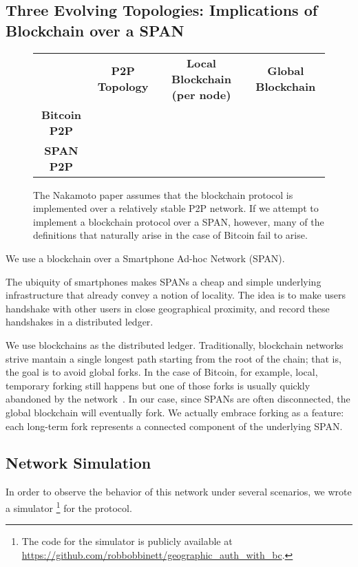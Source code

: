\subsection{Three Evolving Topologies: Implications of Blockchain over a SPAN}

\begin{figure*}
	\centering
	\begin{tabular}{|c||c|c|c|}
		\hline
		\ & \textbf{P2P Topology} & \textbf{Local Blockchain (per node)} & \textbf{Global Blockchain} \\
		\hhline{|=||=|=|=|}
		\textbf{Bitcoin P2P} & \ & \ & \ \\
		\hline
		\textbf{SPAN P2P} & \ & \ & \ \\
		\hline
	\end{tabular}
	\caption{The Nakamoto paper assumes that the blockchain protocol is
		implemented over a relatively stable P2P network. If we attempt to
		implement a blockchain protocol over a SPAN, however, many of the
		definitions that naturally arise in the case of Bitcoin fail to arise.}
	\label{tab:three_table}
\end{figure*}

We use a blockchain over a Smartphone Ad-hoc Network (SPAN).

The ubiquity of smartphones
makes SPANs a cheap and simple underlying infrastructure
that already convey a notion of locality.
The idea is to make users handshake with other users in close geographical proximity,
and record these handshakes in a distributed ledger.

We use blockchains as the distributed ledger.
Traditionally,
blockchain networks strive mantain a single longest path
starting from the root of the chain;
that is,
the goal is to avoid global forks.
In the case of Bitcoin,
for example,
local, temporary forking still happens
but one of those forks is usually quickly abandoned by the network~\cite{decker_2013}.
In our case,
since SPANs are often disconnected,
the global blockchain will eventually fork.
We actually embrace forking as a feature:
each long-term fork represents a connected component of the underlying SPAN.


\subsection{Network Simulation}

In order to observe the behavior of this network under several scenarios,
we wrote a simulator%
\footnote{
	The code for the simulator is publicly available at
	\url{https://github.com/robbobbinett/geographic_auth_with_bc}.
}
for the protocol.

